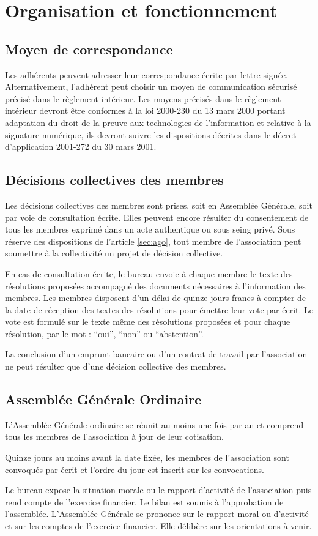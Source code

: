 \documentclass[a4paper,french,10pt]{article}
\newcommand{\article}[1]{\subsection{#1}\addtocounter{article}{1}}
\newcounter{article}
\newcommand{\artref}[1]{article \ref{#1}}
\begin{document}
\section{Organisation et fonctionnement}

\article{Moyen de correspondance}
Les adhérents peuvent adresser leur correspondance écrite par lettre signée. Alternativement, l'adhérent peut choisir un moyen de communication sécurisé précisé dans le règlement intérieur. Les moyens précisés dans le règlement intérieur devront être conformes à la loi 2000-230 du 13 mars 2000 portant adaptation du droit de la preuve aux technologies de l'information et relative à la signature numérique, ils devront suivre les dispositions décrites dans le décret d'application 2001-272 du 30 mars 2001. 

\article{Décisions collectives des membres}
\label{sec:decisions-collectives}

Les décisions collectives des membres sont prises, soit en Assemblée
Générale, soit par voie de consultation écrite. Elles peuvent
encore résulter du consentement de tous les membres exprimé dans un
acte authentique ou sous seing privé. Sous réserve des dispositions de
l’\artref{sec:ago}, tout membre de l’association peut soumettre à la
collectivité un projet de décision collective.

En cas de consultation écrite, le bureau envoie à chaque membre le
texte des résolutions proposées accompagné des documents nécessaires à
l’information des membres. Les membres disposent d’un délai de quinze
jours francs à compter de la date de réception des textes des
résolutions pour émettre leur vote par écrit. Le vote est formulé sur
le texte même des résolutions proposées et pour chaque résolution, par
le mot : “oui”, “non” ou “abstention”.

La conclusion d’un emprunt bancaire ou d’un contrat de travail par
l’association ne peut résulter que d’une décision collective des
membres.

\article{Assemblée Générale Ordinaire}
\label{sec:ago}
L’Assemblée Générale ordinaire se réunit au moins une fois par an et
comprend tous les membres de l’association à jour de leur cotisation.

Quinze jours au moins avant la date fixée, les membres de
l’association sont convoqués par écrit et l’ordre du jour est inscrit
sur les convocations.


Le bureau expose la situation morale ou le rapport d'activité de
l'association puis rend compte de l'exercice financier. Le bilan est
soumis à l'approbation de l'assemblée. 
L’Assemblée Générale se prononce sur le rapport moral ou d’activité et
sur les comptes de l’exercice financier. Elle délibère sur les
orientations à venir.
\end{document}
